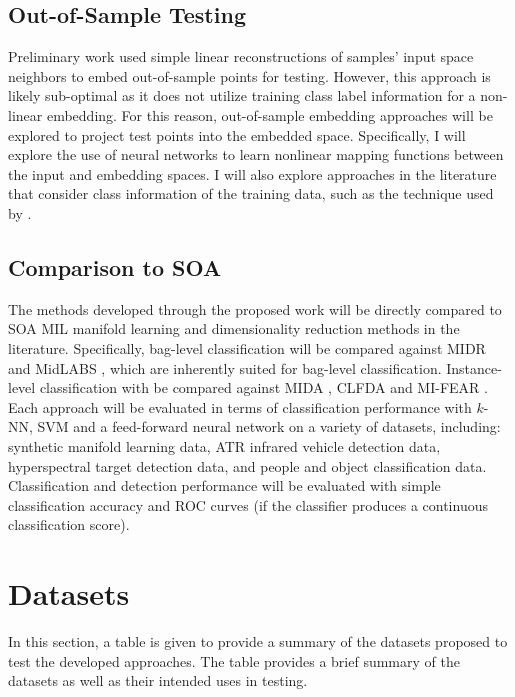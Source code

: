\subsection{Out-of-Sample Testing}
Preliminary work used simple linear reconstructions of  samples' input space neighbors to embed out-of-sample points for testing.  However, this approach is likely sub-optimal as it does not utilize training class label information for a non-linear embedding.  For this reason, out-of-sample embedding approaches will be explored to project test points into the embedded space.  Specifically, I will explore the use of neural networks to learn nonlinear mapping functions between the input and embedding spaces.  I will also explore  approaches in the literature that consider class information of the training data, such as the technique used by  \cite{Vural2016OutOfSampleSupManifoldLearning}. 

\subsection{Comparison to SOA}

The methods developed through the proposed work will be directly compared to SOA MIL manifold learning and dimensionality reduction methods in the literature.  Specifically, bag-level classification will be compared against MIDR \citep{Sun2010MIDR} and MidLABS \citep{Ping2010MILDRMaxMargin}, which are inherently suited for bag-level classification.  Instance-level classification with be compared against MIDA \citep{Chai2014MIDA}, CLFDA \citep{Kim2010LocalDRMIL} and MI-FEAR \citep{Latham2015MIFeatureRankingThesis}.  Each approach will be evaluated in terms of classification performance with $k$-NN, SVM and a feed-forward neural network on a variety of datasets, including: synthetic manifold learning data, ATR infrared vehicle detection data, hyperspectral target detection data, and people and object classification data.  Classification and detection performance will be evaluated with simple classification accuracy and ROC curves (if the classifier produces a continuous classification score).

\section{Datasets}
In this section, a table is given to provide a summary of the datasets proposed to test the developed approaches.  The table provides a brief summary of the datasets as well as their intended uses in testing.

